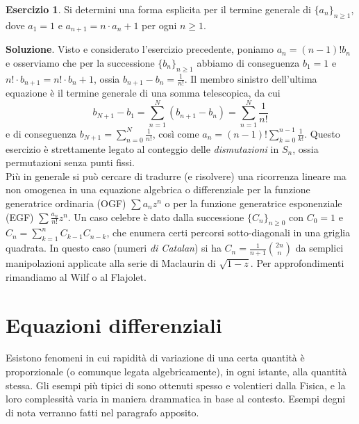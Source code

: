 \documentclass[a4paper,twoside]{article}
\theoremstyle{definition}
\newtheorem{ex}[theorem]{Esercizio}
\numberwithin{theorem}{section}
\begin{document}
\begin{ex} Si determini una forma esplicita per il termine generale di $\{a_n\}_{n\geq 1}$, dove $a_1=1$ e $a_{n+1}=n\cdot a_n + 1$ per ogni $n\geq 1$.
\end{ex}
\textbf{Soluzione}. Visto e considerato l'esercizio precedente, poniamo $a_n=(n-1)! b_n$ e osserviamo che per la successione $\{b_n\}_{n\geq 1}$ abbiamo di conseguenza $b_1=1$ e $n!\cdot b_{n+1} = n!\cdot b_n + 1$, ossia $b_{n+1}-b_n=\frac{1}{n!}$. Il membro sinistro dell'ultima equazione è il termine generale di una somma telescopica, da cui 
$$ b_{N+1}-b_1 = \sum_{n=1}^{N}\left(b_{n+1}-b_n\right) = \sum_{n=1}^{N}\frac{1}{n!}$$
e di conseguenza $b_{N+1}=\sum_{n=0}^{N}\frac{1}{n!}$, così come $a_n = (n-1)!\sum_{k=0}^{n-1}\frac{1}{k!}$. 
Questo esercizio è strettamente legato al conteggio delle \emph{dismutazioni} in $S_n$, ossia permutazioni senza punti fissi.\\


Più in generale si può cercare di tradurre (e risolvere) una ricorrenza lineare ma non omogenea in una equazione algebrica o differenziale per la funzione generatrice ordinaria (OGF) $\sum a_n z^n$ o per la funzione generatrice esponenziale (EGF) $\sum \frac{a_n}{n!} z^n$. Un caso celebre è dato dalla successione $\{C_n\}_{n\geq 0}$ con $C_0=1$ e $C_n=\sum_{k=1}^{n}C_{k-1}C_{n-k}$, che enumera certi percorsi sotto-diagonali in una griglia quadrata. In questo caso (numeri \emph{di Catalan}) si ha $C_n=\frac{1}{n+1}\binom{2n}{n}$ da semplici manipolazioni applicate alla serie di Maclaurin di $\sqrt{1-z}$. Per approfondimenti rimandiamo al Wilf o al Flajolet.


\section{Equazioni differenziali}
Esistono fenomeni in cui rapidità di variazione di una certa quantità è proporzionale (o comunque legata algebricamente), in ogni istante, alla quantità stessa.
Gli esempi più tipici di sono ottenuti spesso e volentieri dalla Fisica, e la loro complessità varia in maniera drammatica in base al contesto. Esempi degni di nota verranno fatti nel paragrafo apposito.
\end{document}
